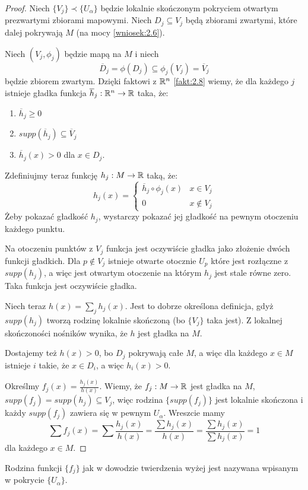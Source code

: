\begin{proof}
Niech $\{V_j\}\prec\{U_\alpha\}$ będzie lokalnie skończonym pokryciem otwartym prezwartymi zbiorami mapowymi. Niech $D_j\subseteq V_j$ będą zbiorami zwartymi, które dalej pokrywają $M$ (na mocy \ref{wniosek:2.6}).

Niech $(V_j, \phi_j)$ będzie mapą na $M$ i niech
$$\overline{D}_j=\phi(D_j)\subseteq\phi_j(V_j)=\overline{V}_j$$
będzie zbiorem zwartym. Dzięki faktowi z $\mathbb{R}^n$ \ref{fakt:2.8} wiemy, że dla każdego $j$ istnieje gładka funkcja $\overline{h}_j:\mathbb{R}^n\to\mathbb{R}$ taka, że:
\begin{enumerate}
  \item $\overline{h}_j\geq 0$
  \item $supp(\overline{h}_j)\subseteq \overline{V}_j$
  \item $\overline{h}_j(x)>0$ dla $x\in D_j$.
\end{enumerate}
Zdefiniujmy teraz funkcję $h_j:M\to\mathbb{R}$ taką, że:
$$h_j(x)=\begin{cases}\overline{h}_j\circ\phi_j(x)&x\in V_j\\0&x\notin V_j\end{cases}$$
Żeby pokazać gładkość $h_j$, wystarczy pokazać jej gładkość na pewnym otoczeniu każdego punktu. 

Na otoczeniu punktów z $V_j$ funkcja jest oczywiście gładka jako złożenie dwóch funkcji gładkich. Dla $p\notin V_j$ istnieje otwarte otocznie $U_p$ które jest rozłączne z $supp(h_j)$, a więc jest otwartym otoczenie na którym $h_j$ jest stale równe zero. Taka funkcja jest oczywiście gładka.

Niech teraz $h(x)=\sum_jh_j(x)$. Jest to dobrze określona definicja, gdyż $supp(h_j)$ tworzą rodzinę lokalnie skończoną (bo $\{V_j\}$ taka jest). Z lokalnej skończoności nośników wynika, że $h$ jest gładka na $M$.

Dostajemy też $h(x)>0$, bo $D_j$ pokrywają całe $M$, a więc dla każdego $x\in M$ istnieje $i$ takie, że $x\in D_i$, a więc $h_i(x)>0$.

Określmy $f_j(x)=\frac{h_j(x)}{h(x)}$. Wiemy, że $f_j:M\to\mathbb{R}$ jest gładka na $M$, $supp(f_j)=supp(h_j)\subseteq V_j$, więc rodzina $\{supp(f_j)\}$ jest lokalnie skończona i każdy $supp(f_j)$ zawiera się w pewnym $U_\alpha$. Wreszcie mamy
$$\sum f_j(x)=\sum\frac{h_j(x)}{h(x)}=\frac{\sum h_j(x)}{h(x)}=\frac{\sum h_j(x)}{\sum h_j(x)}=1$$
dla każdego $x\in M$.
\end{proof}

\begin{definition} Rodzina funkcji $\{f_j\}$ jak w dowodzie twierdzenia wyżej jest nazywana  wpisanym w pokrycie $\{U_\alpha\}$.
\end{definition}

